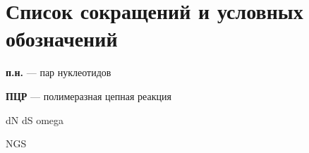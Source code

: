 \chapter*{Список сокращений и условных обозначений}             %

\vskip -24pt


\textbf{п.н.} --- пар нуклеотидов

\textbf{ПЦР} --- полимеразная цепная реакция

dN
dS
omega 

NGS 




%
%
%
%
%
%
%
%


%


%
%
%
%
%
%
%




